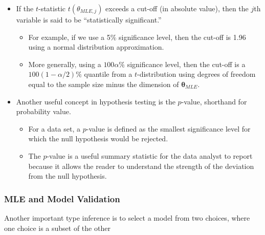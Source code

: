 \documentclass[]{book}
\begin{document}
\begin{itemize}
\item
  If the \(t\)-statistic \(t(\theta_{MLE,j})\) exceeds a cut-off (in
  absolute value), then the \(j\)th variable is said to be
  ``statistically significant.''

  \begin{itemize}
  \item
    For example, if we use a 5\% significance level, then the cut-off is
    1.96 using a normal distribution approximation.
  \item
    More generally, using a \(100 \alpha \%\) significance level, then
    the cut-off is a \(100(1-\alpha/2)\%\) quantile from a
    \(t\)-distribution using degrees of freedom equal to the sample size
    minus the dimension of \(\boldsymbol \theta_{MLE}\).
  \end{itemize}
\item
  Another useful concept in hypothesis testing is the \(p\)-value,
  shorthand for probability value.

  \begin{itemize}
  \item
    For a data set, a \(p\)-value is defined as the smallest
    significance level for which the null hypothesis would be rejected.
  \item
    The \(p\)-value is a useful summary statistic for the data analyst
    to report because it allows the reader to understand the strength of
    the deviation from the null hypothesis.
  \end{itemize}
\end{itemize}

\subsubsection{MLE and Model Validation}\label{mle-and-model-validation}

Another important type inference is to select a model from two choices,
where one choice is a subset of the other
\end{document}
